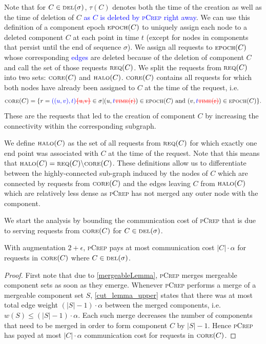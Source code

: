 \documentclass[a4paper,UKenglish,cleveref, autoref, thm-restate,authorcolumns]{../lipics/lipics-v2019}
\newcommand{\adjDel}{\textsc{pCrep}}
\newcommand{\del}{\text{\scriptsize DEL}}
\newcommand{\core}{\text{\scriptsize CORE}}
\newcommand{\halo}{\text{\scriptsize HALO}}
\newcommand{\req}{\text{\scriptsize REQ}}
\newcommand{\epoch}{\text{\scriptsize EPOCH}}
\newcommand{\reqTime}{\text{\scriptsize TIME}}
\newcommand{\new}[1]{{\textcolor{blue}{#1}}}
\newcommand{\old}[1]{{\text{\textcolor{red}{\sout{#1}}}}}
\begin{document}
Note that for $C\in\del(\sigma)$, $\tau(C)$ denotes both the time of the creation as well as the time of deletion of $C$ \new{as $C$ is deleted by \adjDel{} right away}. We can use this definition of a component epoch $\epoch(C)$ to uniquely assign each node to a deleted component $C$ at each point in time $t$ (except for nodes in components that persist until the end of sequence $\sigma$).
We assign all requests to $\epoch(C)$ whose corresponding \new{edges} \old{requests} are deleted because of the deletion of component $C$ and call the set of those requests $\req(C)$.
We split the requests from $\req{}(C)$ into two sets: $\core(C)$ and $\halo(C)$. $\core(C)$ contains all requests for which both nodes have already been assigned to $C$ at the time of the request, i.e. 
\begin{align*}
\core(C)=\{r=\new{((u,v),t)}\old{\{u,v\}}\in\sigma| (u,\new{t}\old{\reqTime(r)})\in \epoch(C)\text{ and } (v, \new{t}\old{\reqTime(r)})\in \epoch(C)\}.
\end{align*}
These are the requests that led to the creation of component $C$ by increasing the connectivity within the corresponding subgraph.

We define $\halo(C)$ as the set of all requests from $\req(C)$ for which exactly one end point was associated with $C$ at the time of the request. Note that this means that $\halo(C)=\req(C)\backslash \core(C)$.
These definitions allow us to differentiate between the highly-connected sub-graph induced by the nodes of $C$ which are connected by requests from $\core(C)$ and the edges leaving $C$ from $\halo(C)$ which are relatively less dense as \adjDel{} has not merged any outer node with the component.

We start the analysis by bounding the communication cost of \adjDel{} that is due to serving requests from $\core(C)$ for $C\in\del{}(\sigma)$.

\begin{lemma}
	\label{core_comm_upper}
	With augmentation $2+\epsilon$, \adjDel{} pays at most communication cost $|C|\cdot\alpha$ for requests in $\core(C)$ where $C\in\del{}(\sigma)$.
\end{lemma}

\begin{proof}
	First note that due to \cref{mergeableLemma}, \adjDel{} merges mergeable component sets as soon as they emerge.
	Whenever \adjDel{} performs a merge of a mergeable component set $S$, \cref{cut_lemma_upper} states that there was at most total edge weight $(|S|-1)\cdot\alpha$ between the merged components, i.e. $w(S)\leq(|S|-1)\cdot\alpha$. Each such merge decreases the number of components that need to be merged in order to form component $C$ by $|S|-1$. Hence \adjDel{} has payed at most $|C|\cdot\alpha$ communication cost for requests in $\core(C)$.
\end{proof}
\end{document}
